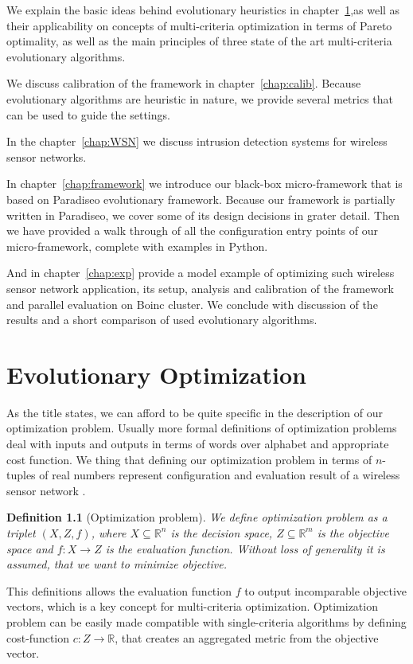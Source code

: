 \documentclass[12pt,oneside]{fithesis2}
\newtheorem{defn}{Definition}
\begin{document}
We explain the basic ideas behind evolutionary heuristics in chapter~\ref{chap:evolution},as well as their applicability on concepts of multi-criteria optimization in terms of Pareto optimality, as well as the main principles of three state of the art multi-criteria evolutionary algorithms. 

We discuss calibration of the framework in chapter~\ref{chap:calib}. Because evolutionary algorithms are heuristic in nature, we provide several metrics that can be used to guide the settings. 

In the chapter~\ref{chap:WSN} we discuss intrusion detection systems for wireless sensor networks.

In chapter~\ref{chap:framework} we introduce our black-box micro-framework that is based on Paradiseo evolutionary framework. Because our framework is partially written in Paradiseo, we cover some of its design decisions in grater detail. Then we have provided a walk through of all the configuration entry points of our micro-framework, complete with examples in Python.

And in chapter~\ref{chap:exp} provide a model example of optimizing such wireless sensor network application, its setup, analysis and calibration of the framework and parallel evaluation on Boinc cluster. We conclude with discussion of the results and a short comparison of used evolutionary algorithms.

\chapter{Evolutionary Optimization}
\label{chap:evolution}
As the title states, we can afford to be quite specific in the description of our optimization problem. Usually more formal definitions of optimization problems deal with inputs and outputs in terms of words over alphabet and appropriate cost function. We thing that defining our optimization problem in terms of $n$-tuples of real numbers represent configuration and evaluation result of a wireless sensor network . 

\begin{defn}[Optimization problem]
We define optimization problem as a triplet $(X,Z,f)$,
 where $X \subseteq \mathbb{R}^n$ is the decision space,
$Z \subseteq \mathbb{R}^m$ is the objective space and $f:X \to Z$ is the evaluation function.
Without loss of generality it is assumed, that we want to minimize objective.
\end{defn}

This definitions allows the evaluation function $f$ to output incomparable objective vectors, which is a key concept for multi-criteria optimization. Optimization problem can be easily made compatible with single-criteria algorithms by defining cost-function $c:Z \to \mathbb{R}$, that creates an aggregated metric from the objective vector.
\end{document}
